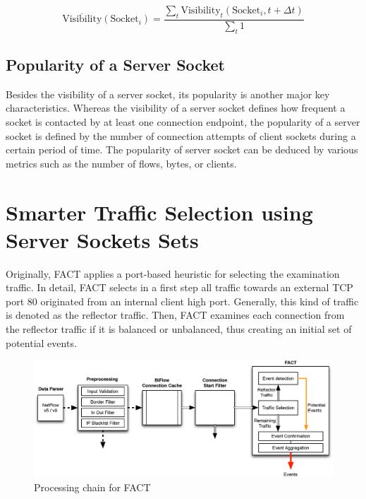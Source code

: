 \begin{equation}
	\overline{\text{Visibility}}(\text{Socket}_i) = \frac{\sum_{t} \text{Visibility}_t(\text{Socket}_i,t+\Delta{t})}{\sum_{t}1}
	\label{eq:visibility_avg}
\end{equation}

\subsection{Popularity of a Server Socket}

Besides the visibility of a \gls{server socket}, its popularity is another major key characteristics. 
Whereas the visibility of a \gls{server socket} defines how frequent a socket is contacted by at least one connection endpoint, the popularity of a \gls{server socket} is defined by the number of connection attempts of client sockets during a certain period of time. 
The popularity of \gls{server socket} can be deduced by various metrics such as the number of flows, bytes, or clients.

\newpage
\section{Smarter Traffic Selection using Server Sockets Sets 
\label{section:ses_traffic_selection}}

Originally, \gls{FACT} applies a port-based heuristic for selecting the  examination traffic.  
In detail, \gls{FACT} selects in a first step all traffic towards an external  \gls{TCP} port 80 originated from an internal client high port. 
Generally, this kind of traffic is denoted as the reflector traffic. 
Then, \gls{FACT} examines each connection from the reflector traffic if it is  balanced or unbalanced, thus creating an initial set of potential events. 

\begin{figure}
	[!b] \centering
	\includegraphics[width=\linewidth]{images/FACT.eps}
	\caption{Processing chain for FACT} 
	\label{fig:fact_chain} 
\end{figure}

